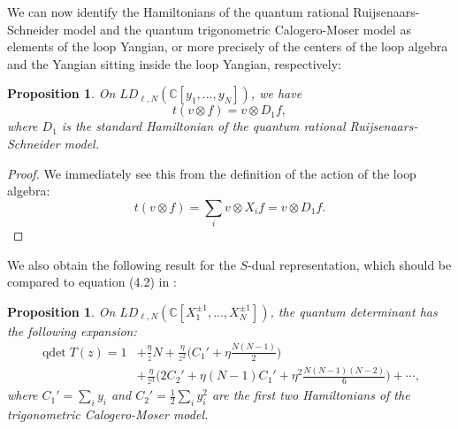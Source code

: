 \documentclass[11pt]{report}
\newtheorem{prop}[theorem]{Proposition}
\theoremstyle{definition}
\theoremstyle{remark}
\theoremstyle{remark}
\newcommand{\C}{\mathbb{C}}
\begin{document}
We can now identify the Hamiltonians of the quantum rational Ruijsenaars-Schneider model and the quantum trigonometric Calogero-Moser model as elements of the loop Yangian, or more precisely of the centers of the loop algebra and the Yangian sitting inside the loop Yangian, respectively:

\begin{prop}
On $LD_{\ell,N}(\C[y_1,...,y_N])$, we have
\begin{equation*}
t(v \otimes f) = v \otimes D_1 f,
\end{equation*}
where $D_1$ is the standard Hamiltonian of the quantum rational Ruijsenaars-Schneider model.
\end{prop}

\begin{proof}
We immediately see this from the definition of the action of the loop algebra:
\begin{equation*}
t(v \otimes f) = \sum_i v \otimes X_i f = v \otimes D_1 f.
\end{equation*}
\end{proof}

We also obtain the following result for the $S$-dual representation, which should be compared to equation (4.2) in \cite{article:bernard:1993}:

\begin{prop}
On $LD_{\ell,N}(\C[X_1^{\pm 1},...,X_N^{\pm 1}])$, the quantum determinant has the following expansion:
\begin{align*}
\operatorname{qdet} T(z)
= 1 &+ \frac{\eta}{z} N + \frac{\eta}{z^2} \bigg( C_1' + \eta \frac{N(N-1)}{2} \bigg) \\
&+ \frac{\eta}{z^3} \bigg( 2C_2' + \eta (N-1) C_1' + \eta^2 \frac{N(N-1)(N-2)}{6} \bigg) + \cdots,
\end{align*}
where $C_1' = \sum_i y_i$ and $C_2' = \frac{1}{2}\sum_i y_i^2$ are the first two Hamiltonians of the trigonometric Calogero-Moser model.
\end{prop}
\end{document}
